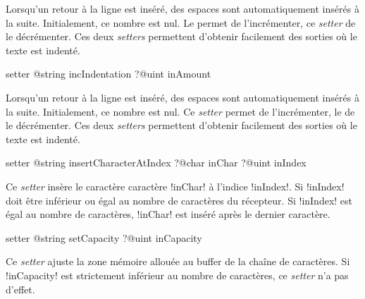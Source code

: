 Lorsqu'un retour à la ligne est inséré, des espaces sont automatiquement insérés à la suite. Initialement, ce nombre est nul. Le  permet de l'incrémenter, ce \emph{setter} de le décrémenter. Ces deux \emph{setters} permettent d'obtenir facilement des sorties où le texte est indenté.






\begin{galgas3box}
setter @string incIndentation ?@uint inAmount
\end{galgas3box}

Lorsqu'un retour à la ligne est inséré, des espaces sont automatiquement insérés à la suite. Initialement, ce nombre est nul. Ce \emph{setter} permet de l'incrémenter, le  de le décrémenter. Ces deux \emph{setters} permettent d'obtenir facilement des sorties où le texte est indenté.









\begin{galgas3box}
setter @string insertCharacterAtIndex
   ?@char inChar
   ?@uint inIndex
\end{galgas3box}


Ce \emph{setter} insère le caractère caractère \ggst!inChar! à l'indice \ggst!inIndex!. Si \ggst!inIndex! doit être inférieur ou égal au nombre de caractères du récepteur. Si \ggst!inIndex! est égal au nombre de caractères, \ggst!inChar! est inséré après le dernier caractère.









\begin{galgas3box}
setter @string setCapacity ?@uint inCapacity
\end{galgas3box}


Ce \emph{setter} ajuste la zone mémoire allouée au buffer de la chaîne de caractères. Si \ggst!inCapacity! est strictement inférieur au nombre de caractères, ce \emph{setter} n'a pas d'effet.







